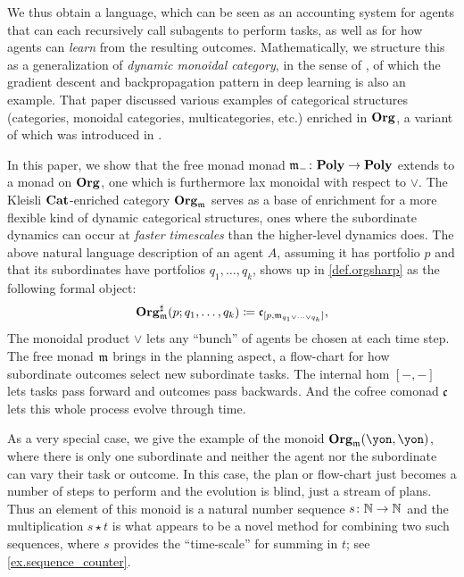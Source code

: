 We thus obtain a language, which can be seen as an accounting system for agents that can each recursively call subagents to perform tasks, as well as for how agents can \emph{learn} from the resulting outcomes. Mathematically, we structure this as a generalization of \emph{dynamic monoidal category}, in the sense of \cite{shapiro2022dynamic}, of which the gradient descent and backpropagation pattern in deep learning is also an example. That paper discussed various examples of categorical structures (categories, monoidal categories, multicategories, etc.) enriched in $\mathbf{Org}$, a variant of which was introduced in \cite[Def 2.19]{spivak2021learnersv1}. 

In this paper, we show that the free monad monad $\mathfrak{m}_-\colon\mathbf{Poly}\to\mathbf{Poly}$ extends to a monad on $\mathbf{Org}$, one which is furthermore lax monoidal with respect to $\vee$. The Kleisli $\mathbf{Cat}$-enriched category $\mathbf{Org}_{\mathfrak{m}}$ serves as a base of enrichment for a more flexible kind of dynamic categorical structures, ones where the subordinate dynamics can occur at \emph{faster timescales} than the higher-level dynamics does. The above natural language description of an agent $A$, assuming it has portfolio $p$ and that its subordinates have portfolios $q_1,\ldots,q_k$, shows up in  \cref{def.orgsharp} as the following formal object:
\begin{equation}\label{eqn.homset}
\mathbf{Org}^\sharp_{\mathfrak{m}}(p;q_1,\ldots,q_k)\coloneqq\mathfrak{c}_{[p,\mathfrak{m}_{q_1\vee\cdots\vee q_k}]},
\end{equation}
The monoidal product $\vee$ lets any ``bunch'' of agents be chosen at each time step. The free monad $\mathfrak{m}$ brings in the planning aspect, a flow-chart for how subordinate outcomes select new subordinate tasks. The internal hom $[-,-]$ lets tasks pass forward and outcomes pass backwards. And the cofree comonad $\mathfrak{c}$ lets this whole process evolve through time. 

As a very special case, we give the example of the monoid $\org_\free(\yon,\yon)$, where there is only one subordinate and neither the agent nor the subordinate can vary their task or outcome. In this case, the plan or flow-chart just becomes a number of steps to perform and the evolution is blind, just a stream of plans. Thus an element of this monoid is a natural number sequence $s\colon\mathbb{N}\to\mathbb{N}$ and the multiplication $s\star t$ is what appears to be a novel method for combining two such sequences, where $s$ provides the ``time-scale'' for summing in $t$; see \cref{ex.sequence_counter}.

